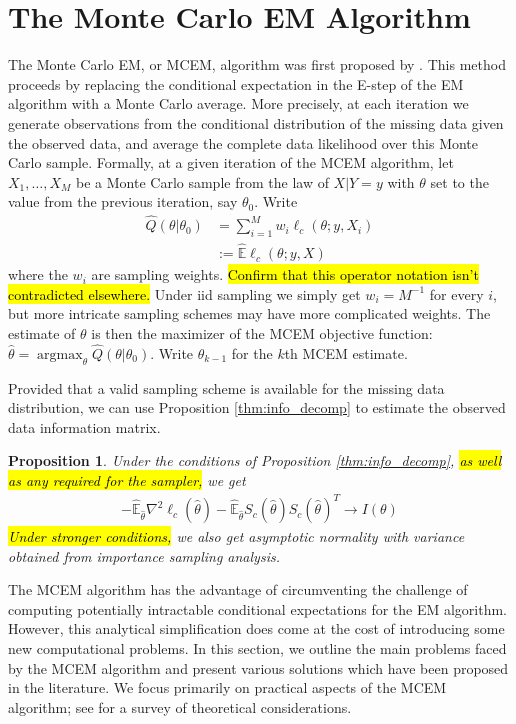 \documentclass[11pt, oneside]{article}   	%
\newcommand{\bE}{\mathbb{E}}
\DeclareMathOperator*{\argmax}{argmax}
\newtheorem{proposition}{Proposition}[section]
\begin{document}
\section{The Monte Carlo EM Algorithm}

The Monte Carlo EM, or MCEM, algorithm was first proposed by \citet{Wei90}. This method proceeds by replacing the conditional expectation in the E-step of the EM algorithm with a Monte Carlo average. More precisely, at each iteration we generate observations from the conditional distribution of the missing data given the observed data, and average the complete data likelihood over this Monte Carlo sample. Formally, at a given iteration of the MCEM algorithm, let $X_1,\ldots, X_M$ be a Monte Carlo sample from the law of $X|Y=y$ with $\theta$ set to the value from the previous iteration, say $\theta_0$. Write
%
\begin{align}
    \hat{Q}(\theta|\theta_0) &= \sum_{i=1}^M w_i \ell_c(\theta; y, X_i)\\
    &:= \hat{\bE} \ell_c (\theta; y, X)
\end{align}
%
where the $w_i$ are sampling weights. \hl{Confirm that this operator notation isn't contradicted elsewhere.} Under iid sampling we simply get $w_i = M^{-1}$ for every $i$, but more intricate sampling schemes may have more complicated weights. The estimate of $\theta$ is then the maximizer of the MCEM objective function: $\hat{\theta} = \argmax_\theta \hat{Q}(\theta|\theta_0)$. Write $\hat{\theta}_{k-1}$ for the $k$th MCEM estimate. 

Provided that a valid sampling scheme is available for the missing data distribution, we can use Proposition \ref{thm:info_decomp} to estimate the observed data information matrix. 

\begin{proposition}
    Under the conditions of Proposition \ref{thm:info_decomp}, \hl{as well as any required for the sampler,} we get
    \begin{align}
        - \hat{\bE}_{\hat{\theta}} \nabla^2 \ell_c(\hat{\theta}) - \hat{\bE}_{\hat{\theta}} S_c(\hat{\theta}) S_c(\hat{\theta})^T \rightarrow I(\theta)
    \end{align}
    \hl{Under stronger conditions,} we also get asymptotic normality with variance obtained from importance sampling analysis.
\end{proposition}

The MCEM algorithm has the advantage of circumventing the challenge of computing potentially intractable conditional expectations for the EM algorithm. However, this analytical simplification does come at the cost of introducing some new computational problems. In this section, we outline the main problems faced by the MCEM algorithm and present various solutions which have been proposed in the literature. We focus primarily on practical aspects of the MCEM algorithm; see \citet{Nea13} for a survey of theoretical considerations.
\end{document}
